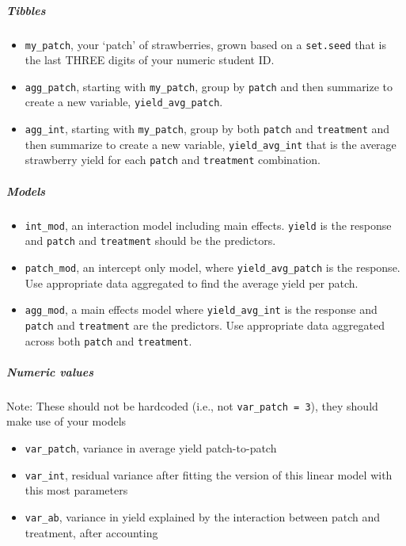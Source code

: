 \documentclass[
  openany]{book}
\begin{document}
\hypertarget{tibbles}{%
\subparagraph{Tibbles}\label{tibbles}}

\begin{itemize}
\item
  \texttt{my\_patch}, your `patch' of strawberries, grown based on a \texttt{set.seed} that is the last THREE digits of your numeric student ID.
\item
  \texttt{agg\_patch}, starting with \texttt{my\_patch}, group by \texttt{patch} and then summarize to create a new variable, \texttt{yield\_avg\_patch}.
\item
  \texttt{agg\_int}, starting with \texttt{my\_patch}, group by both \texttt{patch} and \texttt{treatment} and then summarize to create a new variable, \texttt{yield\_avg\_int} that is the average strawberry yield for each \texttt{patch} and \texttt{treatment} combination.
\end{itemize}

\hypertarget{models}{%
\subparagraph{Models}\label{models}}

\begin{itemize}
\item
  \texttt{int\_mod}, an interaction model including main effects. \texttt{yield} is the response and \texttt{patch} and \texttt{treatment} should be the predictors.
\item
  \texttt{patch\_mod}, an intercept only model, where \texttt{yield\_avg\_patch} is the response. Use appropriate data aggregated to find the average yield per patch.
\item
  \texttt{agg\_mod}, a main effects model where \texttt{yield\_avg\_int} is the response and \texttt{patch} and \texttt{treatment} are the predictors. Use appropriate data aggregated across both \texttt{patch} and \texttt{treatment}.
\end{itemize}

\hypertarget{numeric-values}{%
\subparagraph{Numeric values}\label{numeric-values}}

Note: These should not be hardcoded (i.e., not \texttt{var\_patch\ =\ 3}), they should make use of your models

\begin{itemize}
\item
  \texttt{var\_patch}, variance in average yield patch-to-patch
\item
  \texttt{var\_int}, residual variance after fitting the version of this linear model with this most parameters
\item
  \texttt{var\_ab}, variance in yield explained by the interaction between patch and treatment, after accounting
\end{itemize}
\end{document}

